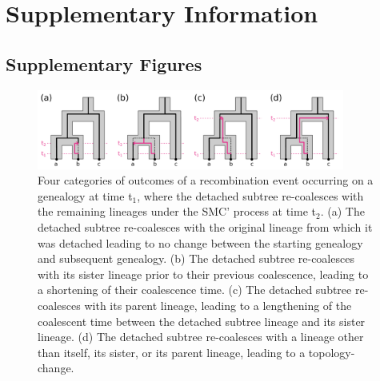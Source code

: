 \documentclass[11pt]{article}
\newcommand{\beginsupplement}{%
	\setcounter{table}{0}
	\setcounter{figure}{0}
	\renewcommand{\thetable}{S\arabic{table}}%
	\renewcommand{\thefigure}{S\arabic{figure}}%
}
\begin{document}






\newpage

\beginsupplement
\section{Supplementary Information}

\subsection{Supplementary Figures}

\begin{figure}[p]
	\centering
	\includegraphics[width=0.9\textwidth]{figures/Fig2-new-recomb-types.pdf}
	\caption{
		Four categories of outcomes of a recombination event occurring on a
		genealogy at time t$_1$, where the detached subtree re-coalesces with
		the remaining lineages under the SMC' process at time t$_2$. (a) The
		detached subtree re-coalesces with the original lineage from which it
		was detached leading to no change between the starting genealogy and 
		subsequent genealogy. (b) The detached subtree re-coalesces with its
		sister lineage prior to their previous coalescence, leading to a shortening
		of their coalescence time. (c) The detached subtree re-coalesces with
		its parent lineage, leading to a lengthening of the coalescent time 
		between the detached subtree lineage and its sister lineage. (d) The
		detached subtree re-coalesces with a lineage other than itself, its sister,
		or its parent lineage, leading to a topology-change. 
	}
     \label{fig:figS-recomb-types}
\end{figure}
\end{document}
